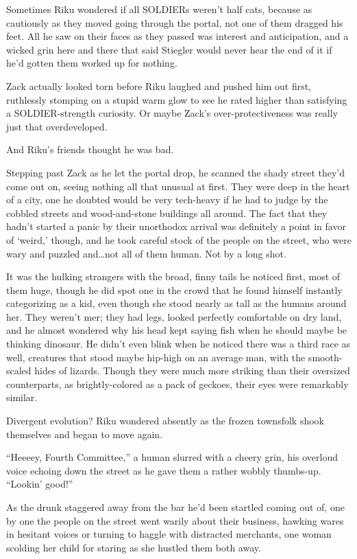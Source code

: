 Sometimes Riku wondered if all SOLDIERs weren't half cats, because as cautiously as they moved going through the portal, not one of them dragged his feet. All he saw on their faces as they passed was interest and anticipation, and a wicked grin here and there that said Stiegler would never hear the end of it if he'd gotten them worked up for nothing.

Zack actually looked torn before Riku laughed and pushed him out first, ruthlessly stomping on a stupid warm glow to see he rated higher than satisfying a SOLDIER-strength curiosity. Or maybe Zack's over-protectiveness was really just that overdeveloped.

And Riku's friends thought he was bad.

Stepping past Zack as he let the portal drop, he scanned the shady street they'd come out on, seeing nothing all that unusual at first. They were deep in the heart of a city, one he doubted would be very tech-heavy if he had to judge by the cobbled streets and wood-and-stone buildings all around. The fact that they hadn't started a panic by their unorthodox arrival was definitely a point in favor of `weird,' though, and he took careful stock of the people on the street, who were wary and puzzled and\ldots not all of them human. Not by a long shot.

It was the hulking strangers with the broad, finny tails he noticed first, most of them huge, though he did spot one in the crowd that he found himself instantly categorizing as a kid, even though she stood nearly as tall as the humans around her. They weren't mer; they had legs, looked perfectly comfortable on dry land, and he almost wondered why his head kept saying fish when he should maybe be thinking dinosaur. He didn't even blink when he noticed there was a third race as well, creatures that stood maybe hip-high on an average man, with the smooth-scaled hides of lizards. Though they were much more striking than their oversized counterparts, as brightly-colored as a pack of geckoes, their eyes were remarkably similar.

Divergent evolution? Riku wondered absently as the frozen townsfolk shook themselves and began to move again.

``Heeeey, Fourth Committee,'' a human slurred with a cheery grin, his overloud voice echoing down the street as he gave them a rather wobbly thumbs-up. ``Lookin' good!''

As the drunk staggered away from the bar he'd been startled coming out of, one by one the people on the street went warily about their business, hawking wares in hesitant voices or turning to haggle with distracted merchants, one woman scolding her child for staring as she hustled them both away.


